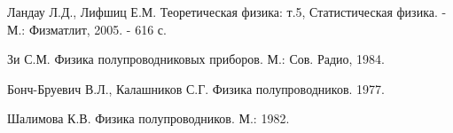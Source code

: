 \documentclass[a4paper,14pt]{extarticle}
\begin{document}



\begin{thebibliography}{99}
 Ландау Л.Д., Лифшиц Е.М. Теоретическая физика: т.5, Статистическая физика. - М.: Физматлит, 2005. - 616 с.

 Зи С.М. Физика полупроводниковых приборов. М.: Сов. Радио, 1984.

   Бонч-Бруевич В.Л., Калашников С.Г. Физика полупроводников. 1977.

    Шалимова К.В. Физика полупроводников. М.: 1982.
\end{thebibliography}
\end{document}

